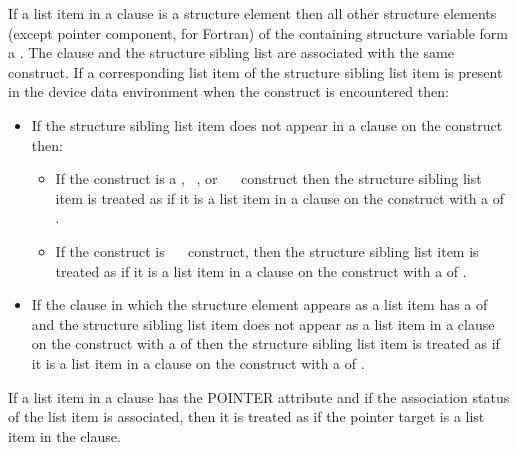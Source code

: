 If a list item in a  clause is a structure element then all other
structure elements (except pointer component, for Fortran) of the
containing structure variable form a .  The  clause and the structure sibling list are
associated with the same construct.  If a corresponding list item of the
structure sibling list item is present in the device data environment when the
construct is encountered then:
    \begin{itemize}

    \item If the structure sibling list item does not appear in a 
    clause on the construct then:
    \begin{itemize}

        \item If the construct is a , ~,
        or ~~ construct then the structure
        sibling list item is treated as if it is a list item in a 
        clause on the construct with a  of .

        \item If the construct is ~~
        construct, then the structure sibling list item is treated as if it is
        a list item in a  clause on the construct with a
         of .

    \end{itemize}

    \item If the  clause in which the structure element appears as a
    list item has a  of  and the structure sibling
    list item does not appear as a list item in a  clause on the
    construct with a  of  then the structure sibling
    list item is treated as if it is a list item in a  clause on the
    construct with a  of .

\end{itemize}

\begin{fortranspecific}
If a list item in a  clause has the POINTER attribute and if
the association status of the list item is associated, then it is
treated as if the pointer target is a list item in the clause.
\end{fortranspecific}

